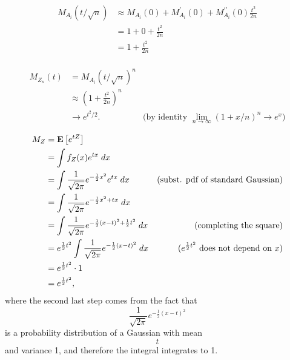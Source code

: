 \documentclass[11pt]{article}
\begin{document}
\begin{align*}
    M_{A_i}(t/\sqrt{n}) & \approx M_{A_i}(0) + M_{A_i}^\prime(0) + M_{A_i}^{\prime \prime}(0) \frac{t^2}{2n} \\
                        & = 1 + 0 + \frac{t^2}{2n}                                                           \\
                        & = 1 + \frac{t^2}{2n}                                                               \\
\end{align*}

\begin{align*}
    M_{Z_n}(t) & = M_{A_i}(t/\sqrt{n})^n                                                                                       \\
               & \approx \left( 1 + \frac{t^2}{2n}  \right)^n                                                                  \\
               & \to e^{t^2/2}.                               & \text{(by identity $\lim_{n \to \infty} (1 + x/n)^n \to e^x$)}
\end{align*}

\begin{align*}
    M_{Z} & = \operatorname*{\mathbf{E}} \left[ e^{tZ} \right]                                                                                                \\
          & = \int f_Z(x) e^{tx} \; dx                                                                                                \\
          & = \int \frac{1}{\sqrt{2 \pi}} e^{-\frac{1}{2}x^2} e^{tx} \; dx                 & \text{(subst. pdf of standard Gaussian)} \\
          & = \int \frac{1}{\sqrt{2 \pi}} e^{-\frac{1}{2}x^2 + tx} \; dx                                                              \\
          & = \int \frac{1}{\sqrt{2 \pi}} e^{-\frac{1}{2}(x - t)^2 + \frac{1}{2}t^2} \; dx & \text{(completing the square)}           \\
          & = e^{\frac{1}{2}t^2} \int \frac{1}{\sqrt{2 \pi}} e^{-\frac{1}{2}(x - t)^2 } \; dx & \text{($e^{\frac{1}{2}t^2}$ does not depend on $x$)}           \\
          & = e^{\frac{1}{2}t^2} \cdot  1 \\
          & = e^{\frac{1}{2}t^2},
\end{align*}
where the second last step comes from the fact that
$$\frac{1}{\sqrt{2 \pi}} e^{-\frac{1}{2}(x - t)^2 }$$ is a probability distribution of a Gaussian with mean $$t$$ and variance 1, 
and therefore the integral integrates to 1.
\end{document}

